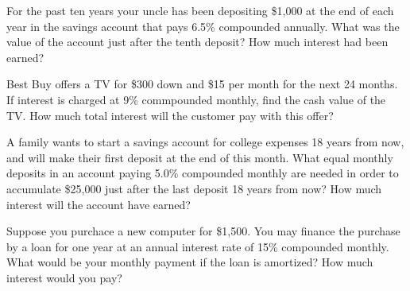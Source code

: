 \documentclass[11pt,epsfig]{article}
\begin{document}
\begin{problem}{5}
For the past ten years your uncle has been depositing \$1,000 at the end of each year in the savings account that pays 6.5\% compounded annually. What was the value of the account just after the tenth deposit? How much interest had been earned?

\vfill
\end{problem}

\newpage

\begin{problem}{5}
Best Buy offers a TV for \$300 down and \$15 per month for the next 24 months. If interest is charged at 9\% commpounded monthly, find the cash value of the TV. How much total interest will the customer pay with this offer?

\vfill
\end{problem}

\begin{problem}{5}
A family wants to start a savings account for college expenses 18 years from now, and will make their first deposit at the end of this month. What equal monthly deposits in an account paying 5.0\% compounded monthly are needed in order to accumulate \$25,000 just after the last deposit 18 years from now? How much interest will the account have earned?  

\vfill
\end{problem}

\begin{problem}{5}
Suppose you purchace a new computer for \$1,500. You may finance the purchase by a loan for one year at an annual interest rate of 15\% compounded monthly. What would be your monthly payment if the loan is amortized? How much interest would you pay?

\vfill
\end{problem}

\showpoints
\end{document}
